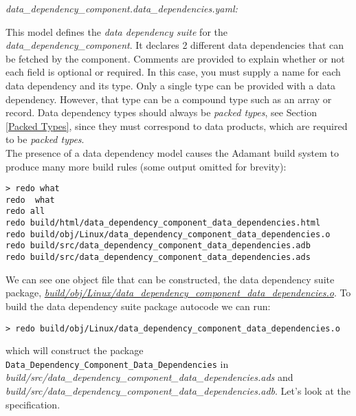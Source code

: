 \textit{data\_dependency\_component.data\_dependencies.yaml:}

This model defines the \textit{data dependency suite} for the \textit{data\_dependency\_component}. It declares 2 different data dependencies that can be fetched by the component. Comments are provided to explain whether or not each field is optional or required. In this case, you must supply a name for each data dependency and its type. Only a single type can be provided with a data dependency. However, that type can be a compound type such as an array or record. Data dependency types should always be \textit{packed types}, see Section \ref{Packed Types}, since they must correspond to data products, which are required to be \textit{packed types}. \\

The presence of a data dependency model causes the Adamant build system to produce many more build rules (some output omitted for brevity):

\vspace{5mm} %
\begin{verbatim}
> redo what 
redo  what
redo all
redo build/html/data_dependency_component_data_dependencies.html
redo build/obj/Linux/data_dependency_component_data_dependencies.o
redo build/src/data_dependency_component_data_dependencies.adb
redo build/src/data_dependency_component_data_dependencies.ads
\end{verbatim}
\vspace{5mm} %

We can see one object file that can be constructed, the data dependency suite package, \textit{\url{build/obj/Linux/data\_dependency\_component\_data\_dependencies.o}}. To build the data dependency suite package autocode we can run:

\vspace{5mm} %
\begin{verbatim}
> redo build/obj/Linux/data_dependency_component_data_dependencies.o
\end{verbatim}
\vspace{5mm} %

which will construct the package \texttt{Data\_Dependency\_Component\_Data\_Dependencies} in \textit{build/src/data\_dependency\_component\_data\_dependencies.ads} and \textit{build/src/data\_dependency\_component\_data\_dependencies.adb}. Let's look at the specification. \\

